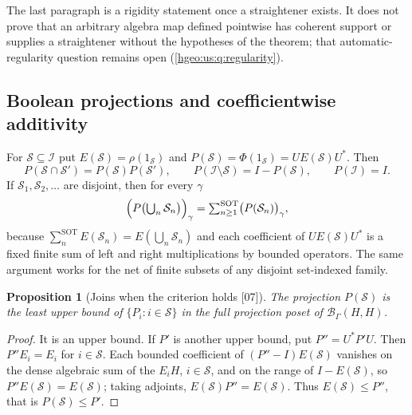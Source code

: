 \documentclass[11pt,letterpaper]{article}
\numberwithin{equation}{section}
\newtheorem{proposition}[proposition]{Proposition}
\theoremstyle{definition}
\theoremstyle{remark}
\newcommand{\BH}{\mathscr B_\Gamma(H,H)}
\newcommand{\src}[1]{\textup{\textsf{\small[#1]}}}
\newcommand{\sSOT}{\mathop{\sum}\nolimits^{\mathrm{SOT}}}
\begin{document}
The last paragraph is a rigidity statement once a straightener exists. It
does not prove that an arbitrary algebra map defined pointwise has coherent
support or supplies a straightener without the hypotheses of the theorem;
that automatic-regularity question remains open
(\cref{hgeo:us:q:regularity}).

\subsection{Boolean projections and coefficientwise additivity}
For $\mathcal S\subseteq\mathcal I$ put
$E(\mathcal S)=\rho(1_{\mathcal S})$ and
$P(\mathcal S)=\Phi(1_{\mathcal S})=UE(\mathcal S)U^*$. Then
\[
 P(\mathcal S\cap\mathcal S')=P(\mathcal S)P(\mathcal S'),\qquad
 P(\mathcal I\setminus\mathcal S)=I-P(\mathcal S),\qquad P(\mathcal I)=I .
\]
If $\mathcal S_1,\mathcal S_2,\ldots$ are disjoint, then for every $\gamma$
\begin{equation}\label{hgeo:us:eq:additivity}
 \Bigl(P\bigl(\textstyle\bigcup_n\mathcal S_n\bigr)\Bigr)_\gamma
 =\sSOT_{n\ge1}\bigl(P(\mathcal S_n)\bigr)_\gamma ,
\end{equation}
because $\sSOT_nE(\mathcal S_n)=E(\bigcup_n\mathcal S_n)$ and each coefficient
of $UE(\mathcal S)U^*$ is a fixed finite sum of left and right multiplications
by bounded operators. The same argument works for the net of finite subsets of
any disjoint set-indexed family.

\begin{proposition}[Joins when the criterion holds \src{07}]
\label{hgeo:us:prop:joins}
The projection $P(\mathcal S)$ is the least upper bound of
$\{P_i:i\in\mathcal S\}$ in the full projection poset of $\BH$.
\end{proposition}
\begin{proof}
It is an upper bound. If $P'$ is another upper bound, put $P''=U^*P'U$. Then
$P''E_i=E_i$ for $i\in\mathcal S$. Each bounded coefficient of
$(P''-I)E(\mathcal S)$ vanishes on the dense algebraic sum of the $E_iH$,
$i\in\mathcal S$, and on the range of $I-E(\mathcal S)$, so
$P''E(\mathcal S)=E(\mathcal S)$; taking adjoints,
$E(\mathcal S)P''=E(\mathcal S)$. Thus $E(\mathcal S)\le P''$, that is
$P(\mathcal S)\le P'$.
\end{proof}
\end{document}
